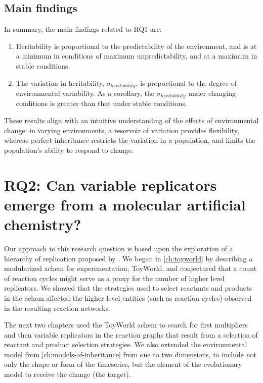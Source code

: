 \subsection{Main findings}

In summary, the main findings related to RQ1 are:

\begin{enumerate}
\item Heritability is proportional to the predictability of the environment, and is at a minimum in conditions of maximum unpredictability, and at a maximum in stable conditions.
\item The variation in heritability, $\sigma_{heritability}$, is proportional to the degree of environmental variability. As a corollary, the $\sigma_{heritability}$ under changing conditions is greater than that under stable conditions.
\end{enumerate}

These results align with an intuitive understanding of the effects of environmental change: in varying environments, a reservoir of variation provides flexibility, whereas perfect inheritance restricts the variation in a population, and limits the population's ability to respond to change. 

\section{RQ2: Can variable replicators emerge from a molecular artificial chemistry?}

Our approach to this research question is based upon the exploration of a hierarchy of replication proposed by \textcite{Zachar2010}. We began in \cref{ch:toyworld} by describing a modularized \gls{achem} for experimentation, ToyWorld, and conjectured that a count of reaction cycles might serve as a proxy for the number of higher level replicators. We showed that the strategies used to select reactants and products in the \gls{achem} affected the higher level entities (such as reaction cycles) observed in the resulting reaction networks. 

The next two chapters used the ToyWorld \gls{achem} to search for first multipliers and then variable replicators in the reaction graphs that result from a selection of reactant and product selection strategies. We also extended the environmental model from \cref{ch:models-of-inheritance} from one to two dimensions, to include not only the shape or form of the timeseries, but the element of the evolutionary model to receive the change (the target). 

